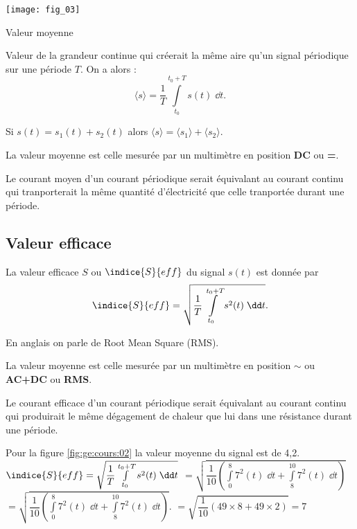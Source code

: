 \begin{marginfigure}
\texttt{[image: fig\_03]}
\caption{Valeur moyenne\label{fig:ge:cours:03}}
\end{marginfigure}

\begin{defi}
Valeur de la grandeur continue qui créerait la même aire qu'un signal périodique sur une période $T$.
On a alors : 
$$\langle s \rangle = \dfrac{1}{T} \int\limits_{t_0}^{t_0+T} s(t)\; \dd t.$$
\end{defi}

\begin{prop}
Si $s(t) = s_1(t)+s_2(t)$ alors  $\langle s \rangle = \langle s_1 \rangle+\langle s_2 \rangle$.
\end{prop}

La valeur moyenne est celle mesurée par un multimètre en position \textbf{DC} ou \textbf{=}.

Le courant moyen d'un courant périodique serait équivalant au courant continu qui tranporterait la même quantité d'électricité que celle tranportée durant une période.

\subsection{Valeur efficace}
\begin{defi}
La valeur efficace $S$ ou $\indice{S}{eff}$ du signal $s(t)$ est donnée par  
$$\indice{S}{eff} = \sqrt{\dfrac{1}{T} \int\limits_{t_0}^{t_0+T} s^2(t)\; \dd t}.$$

En anglais on parle de Root Mean Square (RMS).
\end{defi}


La valeur moyenne est celle mesurée par un multimètre en position $\sim$ 
ou \textbf{AC+DC} ou \textbf{RMS}.

Le courant efficace d'un courant périodique serait équivalant au courant continu qui produirait le même dégagement de chaleur que lui dans une résistance durant une période.

Pour la figure \ref{fig:ge:cours:02} la valeur moyenne du signal est de 4,2.
$\indice{S}{eff} = \sqrt{\dfrac{1}{T} \int\limits_{t_0}^{t_0+T} s^2(t)\; \dd t}$
$=\sqrt{\dfrac{1}{10} \left( \int\limits_{0}^{8} 7^2(t)\; \dd t + \int\limits_{8}^{10} 7^2(t)\; \dd t\right)}$
$=\sqrt{\dfrac{1}{10} \left( \int\limits_{0}^{8} 7^2(t)\; \dd t + \int\limits_{8}^{10} 7^2(t)\; \dd t\right)}.$
$=\sqrt{\dfrac{1}{10} \left( 49 \times 8 + 49 \times 2\right)}=7$



